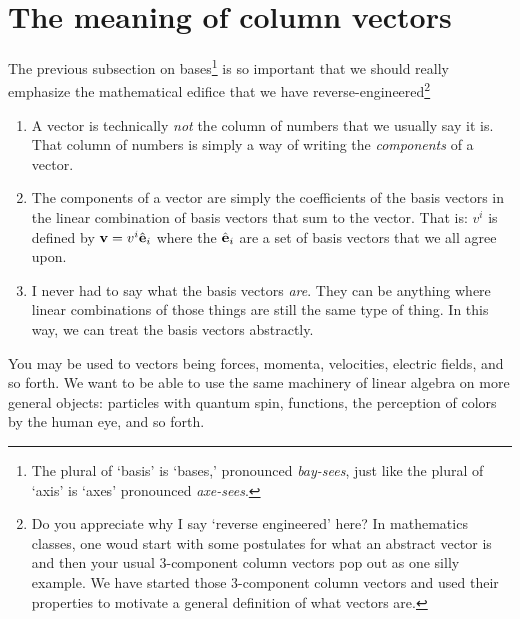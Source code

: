 \section{The meaning of column vectors}

The previous subsection on bases\footnote{The plural of `basis' is `bases,' pronounced \emph{bay-sees}, just like the plural of `axis' is `axes' pronounced \emph{axe-sees}.} is so important that we should really emphasize the mathematical edifice that we have reverse-engineered\footnote{Do you appreciate why I say `reverse engineered' here? In mathematics classes, one woud start with some postulates for what an abstract vector is and then your usual 3-component column vectors pop out as one silly example. We have started those 3-component column vectors and used their properties to motivate a general definition of what vectors are.}
\begin{enumerate}
    \item A vector is technically \emph{not} the column of numbers that we usually say it is. That column of numbers is simply a way of writing the \emph{components} of a vector.
    \item The components of a vector are simply the coefficients of the basis vectors in the linear combination of basis vectors that sum to the vector. That is: $v^i$ is defined by $\mathbf{v} = v^i {\hat{\mathbf{e}}}_i$ where the ${\hat{\mathbf{e}}}_i$ are a set of basis vectors that we all agree upon.
    \item I never had to say what the basis vectors \emph{are}. They can be anything where linear combinations of those things are still the same type of thing. In this way, we can treat the basis vectors abstractly.
\end{enumerate}
You may be used to vectors being forces, momenta, velocities, electric fields, and so forth. We want to be able to use the same machinery of linear algebra on more general objects: particles with quantum spin, functions, the perception of colors by the human eye, and so forth.


